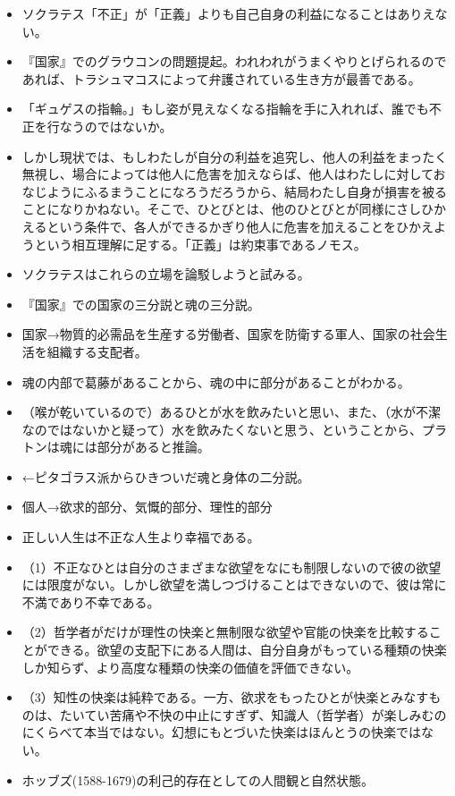 \documentclass{jsarticle}
\begin{document}
\begin{itemize}
\item ソクラテス「不正」が「正義」よりも自己自身の利益になることはありえない。



\item 『国家』でのグラウコンの問題提起。われわれがうまくやりとげられるのであれば、トラシュマコスによって弁護されている生き方が最善である。


\item 「ギュゲスの指輪。」もし姿が見えなくなる指輪を手に入れれば、誰でも不正を行なうのではないか。


\item しかし現状では、もしわたしが自分の利益を追究し、他人の利益をまったく無視し、場合によっては他人に危害を加えならば、他人はわたしに対しておなじようにふるまうことになろうだろうから、結局わたし自身が損害を被ることになりかねない。そこで、ひとびとは、他のひとびとが同様にさしひかえるという条件で、各人ができるかぎり他人に危害を加えることをひかえようという相互理解に足する。「正義」は約束事であるノモス。


\item ソクラテスはこれらの立場を論駁しようと試みる。

\item 『国家』での国家の三分説と魂の三分説。

\item 国家→物質的必需品を生産する労働者、国家を防衛する軍人、国家の社会生活を組織する支配者。

\item 魂の内部で葛藤があることから、魂の中に部分があることがわかる。

\item （喉が乾いているので）あるひとが水を飲みたいと思い、また、（水が不潔なのではないかと疑って）水を飲みたくないと思う、ということから、プラトンは魂には部分があると推論。

\item ←ピタゴラス派からひきついだ魂と身体の二分説。

\item 個人→欲求的部分、気慨的部分、理性的部分

\item 正しい人生は不正な人生より幸福である。

\item （1）不正なひとは自分のさまざまな欲望をなにも制限しないので彼の欲望には限度がない。しかし欲望を満しつづけることはできないので、彼は常に不満であり不幸である。

\item （2）哲学者がだけが理性の快楽と無制限な欲望や官能の快楽を比較することができる。欲望の支配下にある人間は、自分自身がもっている種類の快楽しか知らず、より高度な種類の快楽の価値を評価できない。

\item （3）知性の快楽は純粋である。一方、欲求をもったひとが快楽とみなすものは、たいてい苦痛や不快の中止にすぎず、知識人（哲学者）が楽しみむのにくらべて本当ではない。幻想にもとづいた快楽はほんとうの快楽ではない。


\item ホッブズ(1588-1679)の利己的存在としての人間観と自然状態。

\end{itemize}
\end{document}
